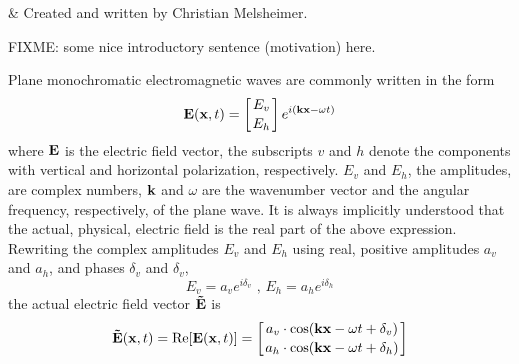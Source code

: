 %
%
 \label{sec:polarization}

%
%
 & Created and written by Christian Melsheimer.\\
\stophistory


%
%





FIXME: some nice introductory sentence (motivation) here.

\label{sec:polarization:monochrom}

Plane monochromatic electromagnetic waves are commonly written in the form
\begin{equation} 
  \label{eq:polarization:e_field}
  \mathbf{E}(\mathbf{x},t) = \left[E_v \atop E_h\right] 
  e^{i(\mathbf{k}\mathbf{x} - \omega t)}
\end{equation}
where $\mathbf{E}$ is the electric field vector, the subscripts $v$
and $h$ denote the components with vertical and horizontal
polarization, respectively. $E_v$ and $E_h$, the amplitudes, are
complex numbers, $\mathbf{k}$ and $\omega$ are the wavenumber vector
and the angular frequency, respectively, of the plane wave.  It is
always implicitly understood that the actual, physical, electric field
is the real part of the above expression. Rewriting the complex
amplitudes $E_v$ and $E_h$ using real, positive amplitudes $a_v$ and
$a_h$, and phases $\delta_v$ and $\delta_v$, 
\begin{equation}
  \label{eq:polarization:compl_ampl}
  E_v=a_v e^{i\delta_v}\mbox{ , }
  E_h=a_h e^{i\delta_h}
\end{equation}
the actual electric field vector $\mathbf{\tilde{E}}$ is
\begin{equation}
  \label{eq:polarization:actual_efield}
  \mathbf{\tilde{E}}(\mathbf{x},t) = \mathrm{Re}[\mathbf{E}(\mathbf{x},t)] 
    = \left[a_v\cdot \cos(\mathbf{k}\mathbf{x} - \omega t + \delta_v) 
                       \atop 
            a_h\cdot \cos(\mathbf{k}\mathbf{x} - \omega t + \delta_h) 
       \right] 
\end{equation}

